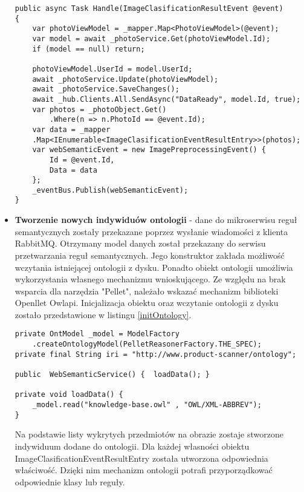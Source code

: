 \begin{itemize}
\begin{lstlisting}[caption={Przekazanie danych do aplikacji mobilnej oraz mikroserwisu reguł semantycznych.}]
public async Task Handle(ImageClasificationResultEvent @event)
{
	var photoViewModel = _mapper.Map<PhotoViewModel>(@event);
	var model = await _photoService.Get(photoViewModel.Id);
	if (model == null) return;
	
	photoViewModel.UserId = model.UserId;
	await _photoService.Update(photoViewModel);
	await _photoService.SaveChanges();
	await _hub.Clients.All.SendAsync("DataReady", model.Id, true);
	var photos = _photoObject.Get()
		.Where(n => n.PhotoId == @event.Id);
	var data = _mapper
	.Map<IEnumerable<ImageClasificationEventResultEntry>>(photos);
	var webSemanticEvent = new ImagePreprocessingEvent() {
		Id = @event.Id,
		Data = data
	};	
	_eventBus.Publish(webSemanticEvent);
}
\end{lstlisting}

\item \textbf{Tworzenie nowych indywiduów ontologii} - dane do mikroserwisu reguł semantycznych zostały przekazane poprzez wysłanie wiadomości \mbox{z} klienta RabbitMQ. Otrzymany model danych został przekazany do serwisu przetwarzania reguł semantycznych. Jego konstruktor zakłada możliwość wczytania istniejącej ontologii z dysku. Ponadto obiekt ontologii umożliwia wykorzystania własnego mechanizmu wnioskującego. Ze względu na brak wsparcia dla narzędzia "Pellet", należało wskazać mechanizm biblioteki Openllet Owlapi. Inicjalizacja obiektu oraz wczytanie ontologii z dysku zostało przedstawione w listingu \ref{initOntology}.
\newpage

\begin{lstlisting}[caption={Stworzenie instancji modelu ontologii.}, label={initOntology}]
private OntModel _model = ModelFactory
	.createOntologyModel(PelletReasonerFactory.THE_SPEC);
private final String iri = "http://www.product-scanner/ontology";

public  WebSemanticService() {	loadData(); }

private void loadData() {
	_model.read("knowledge-base.owl" , "OWL/XML-ABBREV");
}

\end{lstlisting}
Na podstawie listy wykrytych przedmiotów na obrazie zostaje stworzone indywiduum dodane do ontologii. Dla każdej własności obiektu ImageClasificationEventResultEntry została utworzona odpowiednia właściwość. Dzięki nim mechanizm ontologii potrafi przyporządkować odpowiednie klasy lub reguły.
\begin{lstlisting}[caption={Dodanie danych do ontologii.}]


\end{lstlisting}
\end{itemize}
